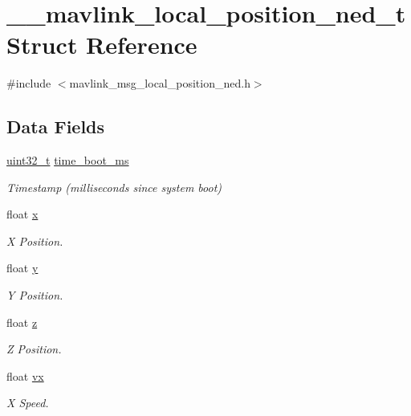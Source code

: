 \hypertarget{struct____mavlink__local__position__ned__t}{\section{\-\_\-\-\_\-mavlink\-\_\-local\-\_\-position\-\_\-ned\-\_\-t Struct Reference}
\label{struct____mavlink__local__position__ned__t}
}


{\ttfamily \#include $<$mavlink\-\_\-msg\-\_\-local\-\_\-position\-\_\-ned.\-h$>$}

\subsection*{Data Fields}
\begin{DoxyCompactItemize}
\item 
\hyperlink{stdint_8h_a435d1572bf3f880d55459d9805097f62}{uint32\-\_\-t} \hyperlink{struct____mavlink__local__position__ned__t_a00187442905b1327719d9fde885a9bf9}{time\-\_\-boot\-\_\-ms}
\begin{DoxyCompactList}\small\item\em Timestamp (milliseconds since system boot) \end{DoxyCompactList}\item 
float \hyperlink{struct____mavlink__local__position__ned__t_ab8f239110cba8ccc0f92aab56bc9a1d3}{x}
\begin{DoxyCompactList}\small\item\em X Position. \end{DoxyCompactList}\item 
float \hyperlink{struct____mavlink__local__position__ned__t_a56754cbe34638a9f6b5adca9ecf7fb44}{y}
\begin{DoxyCompactList}\small\item\em Y Position. \end{DoxyCompactList}\item 
float \hyperlink{struct____mavlink__local__position__ned__t_a4fc3fd6b6974b6b2356e4a7e28f9fecd}{z}
\begin{DoxyCompactList}\small\item\em Z Position. \end{DoxyCompactList}\item 
float \hyperlink{struct____mavlink__local__position__ned__t_a87216fec6527221da8812d77d8d84eb1}{vx}
\begin{DoxyCompactList}\small\item\em X Speed. \end{DoxyCompactList}\item 

\end{DoxyCompactItemize}
